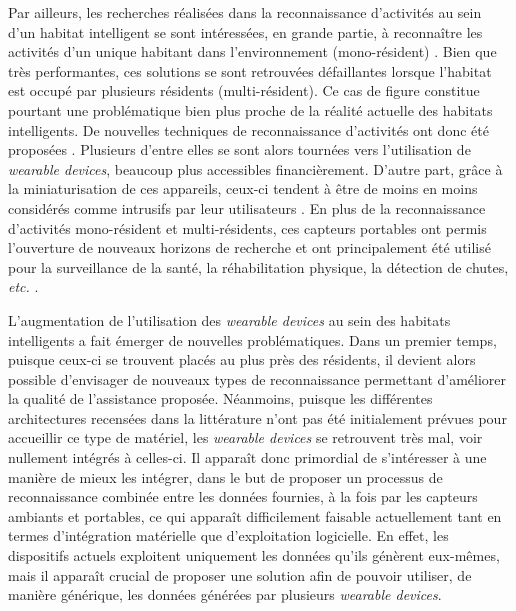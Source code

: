 {{Par ailleurs, les recherches réalisées dans la reconnaissance d'activités au sein d'un habitat intelligent se sont intéressées, en grande partie, à reconnaître les activités d'un unique habitant dans l'environnement (mono-résident) \cite{VikramadityaJakkula2007, VanKasteren2008, Inomata2009, Ghazvininejad2011, Belley2014, Fortin-Simard2015}. Bien que très performantes, ces solutions se sont retrouvées défaillantes lorsque l'habitat est occupé par plusieurs résidents (multi-résident). Ce cas de figure constitue pourtant une problématique bien plus proche de la réalité actuelle des habitats intelligents. De nouvelles techniques de reconnaissance d'activités ont donc été proposées \citep{Crandall2009, Cook2009, Alemdar2013, Ayuningtyas2014, Emi2015, Mokhtari2018}. Plusieurs d'entre elles \citep{Mihailidis2004, Tunca2014} se sont alors tournées vers l'utilisation de \textit{wearable devices}, beaucoup plus accessibles financièrement. D'autre part, grâce à la miniaturisation de ces appareils, ceux-ci tendent à être de moins en moins considérés comme intrusifs par leur utilisateurs \citep{Gaskin2017}. En plus de la reconnaissance d'activités mono-résident et multi-résidents, ces capteurs portables ont permis l'ouverture de nouveaux horizons de recherche et ont principalement été utilisé pour la surveillance de la santé, la réhabilitation physique, la détection de chutes, \textit{etc.} \citep{Patel2012, Mukhopadhyay2014, Delahoz2014}. 

L'augmentation de l'utilisation des \textit{wearable devices} au sein des habitats intelligents a fait émerger de nouvelles problématiques. Dans un premier temps, puisque ceux-ci se trouvent placés au plus près des résidents, il devient alors possible d'envisager de nouveaux types de reconnaissance permettant d'améliorer la qualité de l'assistance proposée. Néanmoins, puisque les différentes architectures recensées dans la littérature n'ont pas été initialement prévues pour accueillir ce type de matériel, les \textit{wearable devices} se retrouvent très mal, voir nullement intégrés à celles-ci. Il apparaît donc primordial de s'intéresser à une manière de mieux les intégrer, dans le but de proposer un processus de reconnaissance combinée entre les données fournies, à la fois par les capteurs ambiants et portables, ce qui apparaît difficilement faisable actuellement tant en termes d'intégration matérielle que d'exploitation logicielle. En effet, les dispositifs actuels exploitent uniquement les données qu'ils génèrent eux-mêmes, mais il apparaît crucial de proposer une solution afin de pouvoir utiliser, de manière générique, les données générées par plusieurs \textit{wearable devices}.

}}
